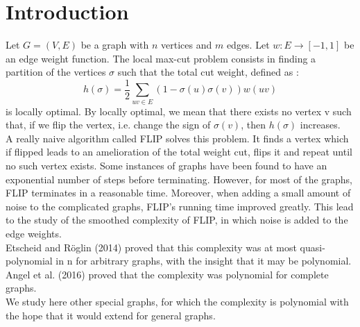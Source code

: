 \section{Introduction}

Let $G = (V,E)$ be a graph with $n$ vertices and $m$ edges.  Let $w : E \rightarrow [-1, 1]$ be an edge weight function. The local max-cut problem consists in finding a partition of the vertices $\sigma$ such that the total cut weight, defined as :
\begin{equation*}
h(\sigma) = \dfrac{1}{2}\sum_{uv \in E}(1 - \sigma(u)\sigma(v))w(uv)
\end{equation*}
is locally optimal. By locally optimal, we mean that there exists no vertex v such that, if we flip the vertex, i.e. change the sign of $\sigma(v)$, then $h(\sigma)$ increases.\\ 

A really naive algorithm called FLIP solves this problem. It finds a vertex which if flipped leads to an amelioration of the total weight cut, flips it and repeat until no such vertex exists. Some instances of graphs have been found to have an exponential number of steps before terminating. However, for most of the graphs, FLIP terminates in a reasonable time. Moreover, when adding a small amount of noise to the complicated graphs, FLIP's running time improved greatly. This lead to the study of the smoothed complexity of FLIP, in which noise is added to the edge weights. \\

Etscheid and Röglin (2014) \cite{Roglin2014} proved that this complexity was at most quasi-polynomial in n for arbitrary graphs, with the insight that it may be polynomial. Angel et al. (2016) \cite{angel2016local} proved that the complexity was polynomial for complete graphs. \\
We study here other special graphs, for which the complexity is polynomial with the hope that it would extend for general graphs.